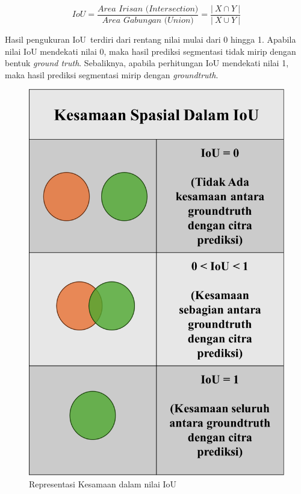 \begin{equation}
	\label{eq:persamaan1}
	\textit{IoU} = \frac{\textit{Area Irisan (Intersection)}}{\textit{Area Gabungan (Union)}} = \frac{|\ X \cap Y\ |}{|\ X \cup Y\ |}
\end{equation}


Hasil pengukuran IoU terdiri dari rentang nilai mulai dari 0 hingga 1. Apabila nilai IoU mendekati nilai 0, maka hasil prediksi segmentasi tidak mirip dengan bentuk \textit{ground truth}. Sebaliknya, apabila perhitungan IoU mendekati nilai 1, maka hasil prediksi segmentasi mirip dengan \textit{groundtruth}.

\begin{figure}[htbp]
	\centering
	\includegraphics[scale= 0.2]{bab2/iou_spasial.png}
	\caption{Representasi Kesamaan dalam nilai IoU}
	\label{fig:iou_spasial}
\end{figure}

